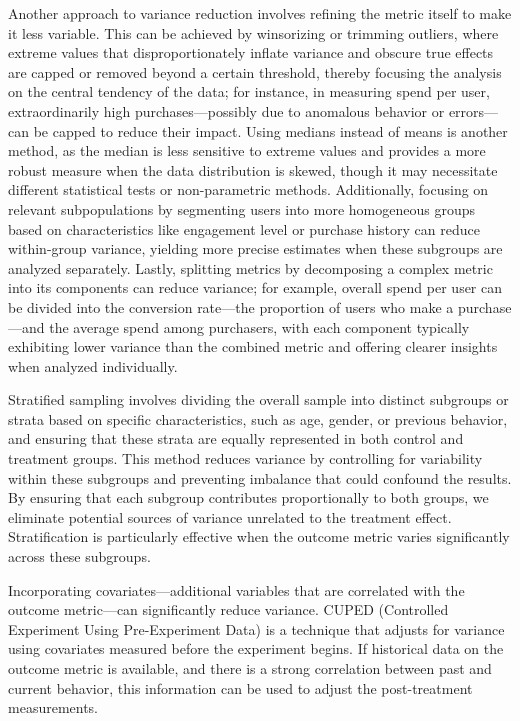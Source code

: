 \documentclass[final,5p,times,twocolumn,authoryear]{elsarticle}
\begin{document}
Another approach to variance reduction involves refining the metric itself to make it less variable. This can be achieved by winsorizing or trimming outliers, where extreme values that disproportionately inflate variance and obscure true effects are capped or removed beyond a certain threshold, thereby focusing the analysis on the central tendency of the data; for instance, in measuring spend per user, extraordinarily high purchases—possibly due to anomalous behavior or errors—can be capped to reduce their impact. Using medians instead of means is another method, as the median is less sensitive to extreme values and provides a more robust measure when the data distribution is skewed, though it may necessitate different statistical tests or non-parametric methods. Additionally, focusing on relevant subpopulations by segmenting users into more homogeneous groups based on characteristics like engagement level or purchase history can reduce within-group variance, yielding more precise estimates when these subgroups are analyzed separately. Lastly, splitting metrics by decomposing a complex metric into its components can reduce variance; for example, overall spend per user can be divided into the conversion rate—the proportion of users who make a purchase—and the average spend among purchasers, with each component typically exhibiting lower variance than the combined metric and offering clearer insights when analyzed individually.

Stratified sampling involves dividing the overall sample into distinct subgroups or strata based on specific characteristics, such as age, gender, or previous behavior, and ensuring that these strata are equally represented in both control and treatment groups. This method reduces variance by controlling for variability within these subgroups and preventing imbalance that could confound the results. By ensuring that each subgroup contributes proportionally to both groups, we eliminate potential sources of variance unrelated to the treatment effect. Stratification is particularly effective when the outcome metric varies significantly across these subgroups.

Incorporating covariates—additional variables that are correlated with the outcome metric—can significantly reduce variance. CUPED (Controlled Experiment Using Pre-Experiment Data) is a technique that adjusts for variance using covariates measured before the experiment begins. If historical data on the outcome metric is available, and there is a strong correlation between past and current behavior, this information can be used to adjust the post-treatment measurements.
\end{document}
